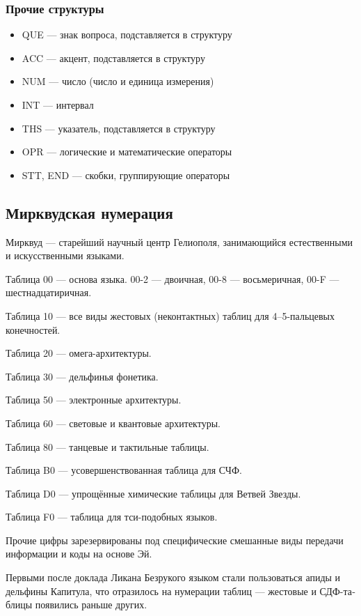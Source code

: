 \documentclass[a4paper,12pt,fleqn]{book}\usepackage{polyglossia}\setdefaultlanguage[babelshorthands=true]{russian}\setotherlanguage{english}\defaultfontfeatures{Ligatures=TeX,Mapping=tex-text}\usepackage{xcolor}\newcommand{\ml}[3]{#2}
\begin{document}
{\subsubsection{Прочие структуры}

\begin{itemize}
\item QUE --- знак вопроса, подставляется в структуру
\item ACC --- акцент, подставляется в структуру
\item NUM --- число (число и единица измерения)
\item INT --- интервал
\item THS --- указатель, подставляется в структуру
\item OPR --- логические и математические операторы
\item STT, END --- скобки, группирующие операторы
\end{itemize}

\subsection{Мирквудская нумерация}

Мирквуд --- старейший научный центр Гелиополя, занимающийся естественными и искусственными языками.

Таблица 00 --- основа языка. 00-2 --- двоичная, 00-8 --- восьмеричная, 00-F --- шестнадцатиричная.

Таблица 10 --- все виды жестовых (неконтактных) таблиц для 4--5-пальцевых конечностей.

Таблица 20 --- омега-архитектуры.

Таблица 30 --- дельфинья фонетика.

Таблица 50 --- электронные архитектуры.

Таблица 60 --- световые и квантовые архитектуры.

Таблица 80 --- танцевые и тактильные таблицы.

Таблица B0 --- усовершенствованная таблица для СЧФ.

Таблица D0 --- упрощённые химические таблицы для Ветвей Звезды.

Таблица F0 --- таблица для тси-подобных языков.

Прочие цифры зарезервированы под специфические смешанные виды передачи информации и коды на основе Эй.

Первыми после доклада Ликана Безрукого языком стали пользоваться апиды и дельфины Капитула, что отразилось на нумерации таблиц --- жестовые и СДФ-таблицы появились раньше других.

}
\end{document}
